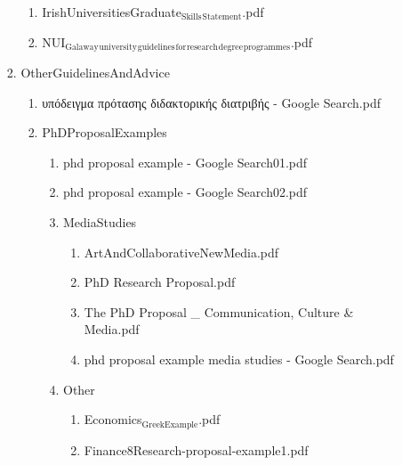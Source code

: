 \documentclass[11pt]{article}
\begin{document}
\begin{enumerate}
\begin{enumerate}
\begin{enumerate}
\begin{enumerate}
\item IrishUniversitiesGraduate$_{\text{Skills}}$$_{\text{Statement}}$.pdf
\label{sec-1-1-1-1-8-8-13-8-2}

\item NUI$_{\text{Galaway}}$$_{\text{university}}$$_{\text{guidelines}}$$_{\text{for}}$$_{\text{research}}$$_{\text{degree}}$$_{\text{programmes}}$.pdf
\label{sec-1-1-1-1-8-8-13-8-3}
\end{enumerate}

\item OtherGuidelinesAndAdvice
\label{sec-1-1-1-1-8-8-13-9}
\begin{enumerate}
\item υπόδειγμα πρότασης διδακτορικής διατριβής - Google Search.pdf
\label{sec-1-1-1-1-8-8-13-9-1}

\item PhDProposalExamples
\label{sec-1-1-1-1-8-8-13-9-2}
\begin{enumerate}
\item phd proposal example - Google Search01.pdf
\label{sec-1-1-1-1-8-8-13-9-2-1}

\item phd proposal example - Google Search02.pdf
\label{sec-1-1-1-1-8-8-13-9-2-2}

\item MediaStudies
\label{sec-1-1-1-1-8-8-13-9-2-3}
\begin{enumerate}
\item ArtAndCollaborativeNewMedia.pdf
\label{sec-1-1-1-1-8-8-13-9-2-3-1}

\item PhD Research Proposal.pdf
\label{sec-1-1-1-1-8-8-13-9-2-3-2}

\item The PhD Proposal \_ Communication, Culture \& Media.pdf
\label{sec-1-1-1-1-8-8-13-9-2-3-3}

\item phd proposal example media studies - Google Search.pdf
\label{sec-1-1-1-1-8-8-13-9-2-3-4}
\end{enumerate}

\item Other
\label{sec-1-1-1-1-8-8-13-9-2-4}
\begin{enumerate}
\item Economics$_{\text{GreekExample}}$.pdf
\label{sec-1-1-1-1-8-8-13-9-2-4-1}

\item Finance8Research-proposal-example1.pdf
\label{sec-1-1-1-1-8-8-13-9-2-4-2}


\end{enumerate}
\end{enumerate}
\end{enumerate}
\end{enumerate}
\end{enumerate}
\end{enumerate}
\end{document}
